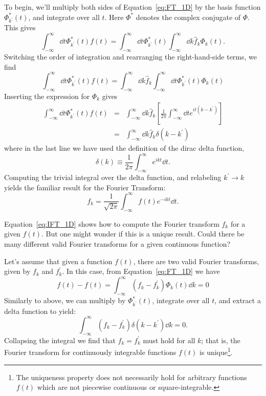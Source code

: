 To begin, we'll multiply both sides of Equation~\ref{eq:FT_1D} by the
basis function $\Phi^*_{k^\prime}(t)$, and integrate over all $t$.
Here $\Phi^\ast$ denotes the complex conjugate of $\Phi$.  This gives
\begin{equation}
  \int_{-\infty}^\infty \dd t \Phi^\ast_{k^\prime}(t) f(t)
  = \int_{-\infty}^\infty \dd t \Phi^\ast_{k^\prime}(t)
  \int_{-\infty}^\infty \dd k \hat{f}_k \Phi_k(t).
\end{equation}
Switching the order of integration and rearranging the right-hand-side
terms, we find
\begin{equation}
  \label{eq:IFT_deriv1}
  \int_{-\infty}^\infty \dd t \Phi^\ast_{k^\prime}(t) f(t)
  = \int_{-\infty}^\infty \dd k \hat{f}_k
  \int_{-\infty}^\infty \dd t \Phi^\ast_{k^\prime}(t)\Phi_k(t)
\end{equation}
Inserting the expression for $\Phi_k$ gives
\begin{eqnarray}
  \int_{-\infty}^\infty \dd t \Phi^\ast_{k^\prime}(t) f(t)
  &=& \int_{-\infty}^\infty \dd k \hat{f}_k
  \left[\frac{1}{2\pi} \int_{-\infty}^\infty
  \dd t e^{i t (k - k^\prime)}\right]\nonumber\\
  &=& \int_{-\infty}^\infty \dd k \hat{f}_k \delta(k - k^\prime)
\end{eqnarray}
where in the last line we have used the definition of the dirac delta
function,
\begin{equation}
  \delta(k) \equiv \frac{1}{2\pi} \int_{-\infty}^\infty e^{ikt} \dd t.
\end{equation}
Computing the trivial integral over the delta function, and relabeling
$k^\prime \to k$ yields the familiar result for the Fourier Transform:
\begin{equation}
  \label{eq:IFT_1D}
  f_k = \frac{1}{\sqrt{2\pi}}\int_{-\infty}^\infty f(t) e^{-ikt} \dd t.
\end{equation}

Equation~\ref{eq:IFT_1D} shows how to compute the Fourier transform
$f_k$ for a given $f(t)$.  But one might wonder if this is a unique
result.  Could there be many different valid Fourier transforms for a given
continuous function?

Let's assume that given a function $f(t)$, there are two valid Fourier
transforms, given by $f_k$ and $f^\prime_k$.  In this case, from
Equation~\ref{eq:FT_1D} we have
\begin{equation}
  f(t) - f(t) = \int_{-\infty}^\infty (f_k - f^\prime_k) \Phi_k(t) \dd k = 0
\end{equation}
Similarly to above, we can multiply by $\Phi^\ast_{k^\prime}(t)$,
integrate over all $t$, and extract a delta function to yield:
\begin{equation}
  \int_{-\infty}^\infty (f_k - f^\prime_k) \delta(k - k^\prime) \dd k = 0.
\end{equation}
Collapsing the integral we find that $f_k = f^\prime_k$ must hold for all $k$;
that is, the Fourier transform for continuously integrable functions
$f(t)$ is unique\footnote{The uniqueness property does not necessarily
hold for arbitrary functions $f(t)$ which are not piecewise continuous
or square-integrable.}.

